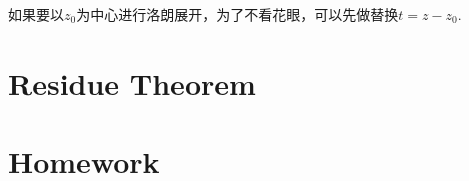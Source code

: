 \documentclass[CJK]{beamer}
\begin{document}
\begin{frame}
  \bch
  如果要以$z_0$为中心进行洛朗展开，为了不看花眼，可以先做替换$t=z-z_0$.
  \ech
\end{frame}


\section{Residue Theorem}

\begin{frame}
  \bch
  
  \ech
\end{frame}


\section{Homework}
\end{document}
